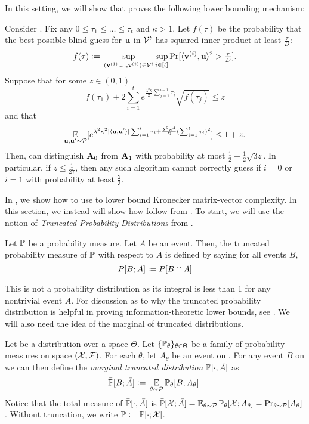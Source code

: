 In this setting, we will show that \cite{simchowitz2017gap} proves the following lower bounding mechanism:

\begin{theorem}
	\label{thm:abstract-simchowitz-requirements}
	Consider .
	Fix any \(0 \leq \tau_1 \leq \ldots \leq \tau_t\) and \(\kappa > 1\).
	Let \(f(\tau)\) be the probability that the best possible blind guess for \(\boldsymbol{\mathrm{u}}\) in \({\mathcal V}^t\) has squared inner product at least \(\frac{\tau}{D}\):
	\[
		f(\tau) \;{\vcentcolon=}\; \sup_{(\boldsymbol{\mathrm{v}}^{(1)},\ldots,\boldsymbol{\mathrm{v}}^{(t)})\in{\mathcal V}^t} \sup_{i\in[t]} \Pr[\langle \boldsymbol{\mathrm{v}}^{(i)}, \boldsymbol{\mathrm{u}}\rangle^2 > {{\textstyle\frac{\tau}{D}}}].
	\]
	Suppose that for some \(z\in(0,1)\)
	\[
		f(\tau_1) + 2 \sum_{i=1}^t e^{\frac{\lambda^2\kappa}2 \sum_{j=1}^{i-1}\tau_j}\sqrt{f(\tau_j)} \leq z
	\]
	and that
	\[
		\operatorname*{\mathbb{E}}_{\boldsymbol{\mathrm{u}},\boldsymbol{\mathrm{u}}'\sim{\mathcal P}}[e^{\lambda^2 \kappa^2 |\langle \boldsymbol{\mathrm{u}}, \boldsymbol{\mathrm{u}}'\rangle|\sum_{i=1}^t \tau_i + \frac{\lambda^2\kappa^4}{D}(\sum_{i=1}^t \tau_i)^2}] \leq 1+z.
	\]
	Then, \cA can distinguish \(\mathbf{A}_0\) from \(\mathbf{A}_1\) with probability at most \(\frac12 + \frac12 \sqrt{3z}\).
	In particular, if \(z \leq \frac1{27}\), then any such algorithm \cA cannot correctly guess if \(i=0\) or \(i=1\) with probability at least \(\frac23\).
\end{theorem}

In , we show how to use  to lower bound Kronecker matrix-vector complexity.
In this section, we instead will show how  follow from \cite{simchowitz2017gap}.
To start, we will use the notion of \emph{Truncated Probability Distributions} from \cite{simchowitz2017gap}.
\begin{definition}
Let \({\mathbb P}\) be a probability measure.
Let \(A\) be an event.
Then, the truncated probability measure of \({\mathbb P}\) with respect to \(A\) is defined by saying for all events \(B\),
\[
	P[B ; A] \;{\vcentcolon=}\; P[B \cap A]
\]
\end{definition}
This is not a probability distribution as its integral is less than 1 for any nontrivial event \(A\).
For discussion as to why the truncated probability distribution is helpful in proving information-theoretic lower bounds, see \cite{simchowitz2017gap,simchowitz2018tight}.
We will also need the idea of the marginal of truncated distributions.
\begin{definition}
    Let \cP be a distribution over a space \(\Theta\).
    Let \(\{{\mathbb P}_{\theta}\}_{\theta\in\Theta}\) be a family of probability measures on space \(({\mathcal X},{\mathcal F})\).
    For each \(\theta\), let \(A_\theta\) be an event on \cF.
    For any event \(B\) on \cF we can then define the \emph{marginal truncated distribution} \(\bar{{\mathbb P}}[\cdot;\bar A]\) as
    \[
        \bar{{\mathbb P}}[B;\bar A] \;{\vcentcolon=}\; \operatorname*{\mathbb{E}}_{\theta \sim {\mathcal P}} {\mathbb P}_\theta[B;A_\theta].
    \]
    Notice that the total measure of \(\bar{{\mathbb P}}[\cdot,\bar A]\) is \(\bar{{\mathbb P}}[{\mathcal X};\bar A] = \operatorname*{\mathbb{E}}_{\theta\sim{\mathcal P}}{\mathbb P}_\theta[{\mathcal X};A_\theta] = \Pr_{\theta\sim{\mathcal P}}[A_\theta]\).
    Without truncation, we write \(\bar{{\mathbb P}} \;{\vcentcolon=}\; \bar{{\mathbb P}}[\cdot;{\mathcal X}]\).
\end{definition}

